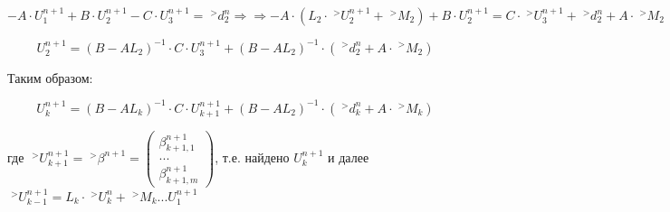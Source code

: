 \documentclass[__main__.tex]{subfiles}
\begin{document}
$$
- A \cdot U^{n+1}_{1} + B \cdot U^{n+1}_{2} - C \cdot U^{n+1}_{3} = \;^{>}d^n_2 \Rightarrow 
\Rightarrow - A \cdot (L_{2} \cdot \;^{>}U^{n+1}_{2} + \;^{>}M_{2}) + B \cdot U^{n+1}_{2} = C \cdot \;^{>}U^{n+1}_{3} + \;^{>}d^n_2 + A \cdot \;^{>}M_{2}
$$

$$
U^{n+1}_{2} = (B - AL_2)^{-1}\cdot C \cdot U^{n+1}_{3} + (B - AL_2)^{-1} \cdot (\;^{>}d^n_2 + A \cdot \;^{>}M_{2})
$$

Таким образом:

$$
U^{n+1}_{k} = (B - AL_k)^{-1}\cdot C \cdot U^{n+1}_{k+1} + (B - AL_2)^{-1} \cdot (\;^{>}d^n_k + A \cdot \;^{>}M_{k})
$$

где $\;^{>}U^{n+1}_{k+1} = \;^{>}\beta^{n+1} = \left(
\begin{matrix}
\beta^{n+1}_{k+1,1} \\
...  \\
\beta^{n+1}_{k+1,m} 
\end{matrix}
\right)$, т.е. найдено $U^{n+1}_{k}$ и далее $\;^{>}U^{n+1}_{k-1} = L_{k} \cdot \;^{>}U^{n}_{k} + \;^{>}M_{k} ... U^{n+1}_1$
 
\end{document}
